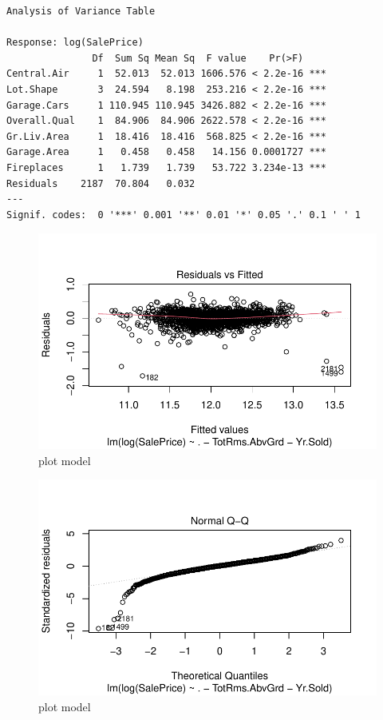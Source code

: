 \documentclass[
  letterpaper,
  DIV=11,
  numbers=noendperiod]{scrartcl}
\begin{document}
\begin{verbatim}
Analysis of Variance Table

Response: log(SalePrice)
               Df  Sum Sq Mean Sq  F value    Pr(>F)    
Central.Air     1  52.013  52.013 1606.576 < 2.2e-16 ***
Lot.Shape       3  24.594   8.198  253.216 < 2.2e-16 ***
Garage.Cars     1 110.945 110.945 3426.882 < 2.2e-16 ***
Overall.Qual    1  84.906  84.906 2622.578 < 2.2e-16 ***
Gr.Liv.Area     1  18.416  18.416  568.825 < 2.2e-16 ***
Garage.Area     1   0.458   0.458   14.156 0.0001727 ***
Fireplaces      1   1.739   1.739   53.722 3.234e-13 ***
Residuals    2187  70.804   0.032                       
---
Signif. codes:  0 '***' 0.001 '**' 0.01 '*' 0.05 '.' 0.1 ' ' 1
\end{verbatim}

\begin{figure}[H]

{\centering \includegraphics{paper_files/figure-pdf/plot1-1.pdf}

}

\caption{plot model}

\end{figure}%

\begin{figure}[H]

{\centering \includegraphics{paper_files/figure-pdf/plot1-2.pdf}

}

\caption{plot model}

\end{figure}%
\end{document}

